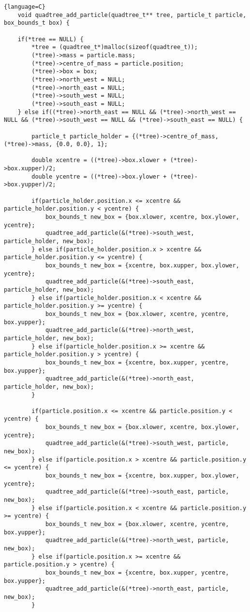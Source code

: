 \documentclass{article}
\begin{document}
\begin{lstlisting}{language=C}
    void quadtree_add_particle(quadtree_t** tree, particle_t particle, box_bounds_t box) {

    if(*tree == NULL) {
        *tree = (quadtree_t*)malloc(sizeof(quadtree_t));
        (*tree)->mass = particle.mass;
        (*tree)->centre_of_mass = particle.position;
        (*tree)->box = box;
        (*tree)->north_west = NULL;
        (*tree)->north_east = NULL;
        (*tree)->south_west = NULL;
        (*tree)->south_east = NULL;
    } else if((*tree)->north_east == NULL && (*tree)->north_west == NULL && (*tree)->south_west == NULL && (*tree)->south_east == NULL) {
        
        particle_t particle_holder = {(*tree)->centre_of_mass, (*tree)->mass, {0.0, 0.0}, 1};
        
        double xcentre = ((*tree)->box.xlower + (*tree)->box.xupper)/2;
        double ycentre = ((*tree)->box.ylower + (*tree)->box.yupper)/2;

        if(particle_holder.position.x <= xcentre && particle_holder.position.y < ycentre) {
            box_bounds_t new_box = {box.xlower, xcentre, box.ylower, ycentre};
            quadtree_add_particle(&(*tree)->south_west, particle_holder, new_box);
        } else if(particle_holder.position.x > xcentre && particle_holder.position.y <= ycentre) {
            box_bounds_t new_box = {xcentre, box.xupper, box.ylower, ycentre};
            quadtree_add_particle(&(*tree)->south_east, particle_holder, new_box);
        } else if(particle_holder.position.x < xcentre && particle_holder.position.y >= ycentre) {
            box_bounds_t new_box = {box.xlower, xcentre, ycentre, box.yupper};
            quadtree_add_particle(&(*tree)->north_west, particle_holder, new_box);
        } else if(particle_holder.position.x >= xcentre && particle_holder.position.y > ycentre) {
            box_bounds_t new_box = {xcentre, box.xupper, ycentre, box.yupper};
            quadtree_add_particle(&(*tree)->north_east, particle_holder, new_box);
        }

        if(particle.position.x <= xcentre && particle.position.y < ycentre) {
            box_bounds_t new_box = {box.xlower, xcentre, box.ylower, ycentre};
            quadtree_add_particle(&(*tree)->south_west, particle, new_box);
        } else if(particle.position.x > xcentre && particle.position.y <= ycentre) {
            box_bounds_t new_box = {xcentre, box.xupper, box.ylower, ycentre};
            quadtree_add_particle(&(*tree)->south_east, particle, new_box);
        } else if(particle.position.x < xcentre && particle.position.y >= ycentre) {
            box_bounds_t new_box = {box.xlower, xcentre, ycentre, box.yupper};
            quadtree_add_particle(&(*tree)->north_west, particle, new_box);
        } else if(particle.position.x >= xcentre && particle.position.y > ycentre) {
            box_bounds_t new_box = {xcentre, box.xupper, ycentre, box.yupper};
            quadtree_add_particle(&(*tree)->north_east, particle, new_box);
        }


\end{lstlisting}
\end{document}
